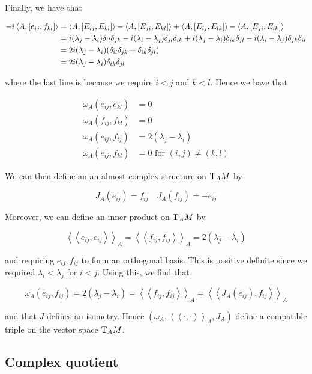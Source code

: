 \documentclass{article}
\newcommand{\iinner}[1]{\left\langle\!\left\langle #1 \right\rangle\!\right\rangle}
\begin{document}
Finally, we have that

\begin{align*}
    -i\left\langle A, [e_{ij}, f_{kl}] \right\rangle &= \left\langle A, [E_{ij}, E_{kl}] \right\rangle - \left\langle A, [E_{ji}, E_{kl}] \right\rangle + \left\langle A, [E_{ij}, E_{lk}] \right\rangle - \left\langle A, [E_{ji}, E_{lk}] \right\rangle \\
    &= i(\lambda_j - \lambda_i)\delta_{il}\delta_{jk} - i(\lambda_i - \lambda_j)\delta_{jl}\delta_{ik} + i(\lambda_j - \lambda_i)\delta_{ik}\delta_{jl} - i(\lambda_i - \lambda_j)\delta_{jk}\delta_{il} \\
    &= 2i(\lambda_j - \lambda_i)(\delta_{il}\delta_{jk} + \delta_{ik}\delta_{jl}) \\
    &= 2i(\lambda_j - \lambda_i)\delta_{ik}\delta_{jl}
\end{align*}

where the last line is because we require \(i < j\) and \(k < l\). Hence we have that

\begin{align*}
    \omega_A(e_{ij}, e_{kl}) &= 0 \\
    \omega_A(f_{ij}, f_{kl}) &= 0 \\
    \omega_A(e_{ij}, f_{ij}) &= 2(\lambda_j - \lambda_i) \\
    \omega_A(e_{ij}, f_{kl}) &= 0 \text{ for }(i, j) \ne (k, l)
\end{align*}

We can then define an an almost complex structure on \(\mathrm{T}_AM\) by

\begin{equation}
    \label{eq:cx-str-vector}
    J_A(e_{ij}) = f_{ij} \quad J_A(f_{ij}) = -e_{ij}
\end{equation}

Moreover, we can define an inner product on \(\mathrm{T}_AM\) by

\[\iinner{e_{ij}, e_{ij}}_A = \iinner{f_{ij}, f_{ij}}_A = 2(\lambda_j - \lambda_i)\]

and requiring \(e_{ij}, f_{ij}\) to form an orthogonal basis. This is positive definite since we required \(\lambda_i < \lambda_j\) for \(i < j\). Using this, we find that

\[\omega_A(e_{ij}, f_{ij}) = 2(\lambda_j - \lambda_i) = \iinner{f_{ij}, f_{ij}}_A = \iinner{J_A(e_{ij}), f_{ij}}_A\]

and that \(J\) defines an isometry. Hence \((\omega_A, \iinner{\cdot, \cdot}_A, J_A)\) define a compatible triple on the vector space \(\mathrm{T}_AM\).

\subsection{Complex quotient}
\end{document}
